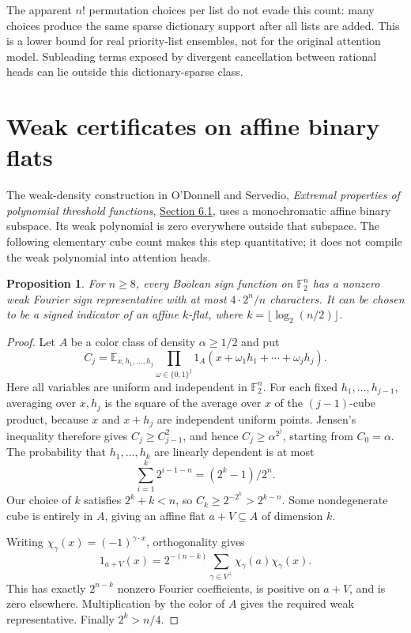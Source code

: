 \documentclass[11pt]{article}
\newtheorem{proposition}[theorem]{Proposition}
\begin{document}
The apparent $n!$ permutation choices per list do not evade this
count: many choices produce the same sparse dictionary support after
all lists are added. This is a lower bound for real priority-list
ensembles, not for the original attention model. Subleading terms
exposed by divergent cancellation between rational heads can lie
outside this dictionary-sparse class.

\section{Weak certificates on affine binary flats}

The weak-density construction in O'Donnell and Servedio,
\emph{Extremal properties of polynomial threshold functions},
\href{https://www.cs.columbia.edu/~rocco/Public/journal-revised2.pdf}{Section 6.1},
uses a monochromatic affine binary subspace. Its weak polynomial is
zero everywhere outside that subspace. The following elementary cube
count makes this step quantitative; it does not compile the weak
polynomial into attention heads.

\begin{proposition}\label{prop:weak-flat}
For $n\geq8$, every Boolean sign function on $\mathbb F_2^n$ has a
nonzero weak Fourier sign representative with at most $4\cdot2^n/n$
characters. It can be chosen to be a signed indicator of an affine
$k$-flat, where $k=\lfloor\log_2(n/2)\rfloor$.
\end{proposition}

\begin{proof}
Let $A$ be a color class of density $\alpha\geq1/2$ and put
\[
 C_j=\mathbb E_{x,h_1,\ldots,h_j}
       \prod_{\omega\in\{0,1\}^j}
       1_A(x+\omega_1h_1+\cdots+\omega_jh_j).
\]
Here all variables are uniform and independent in $\mathbb F_2^n$.
For each fixed $h_1,\ldots,h_{j-1}$, averaging over $x,h_j$ is the
square of the average over $x$ of the $(j-1)$-cube product, because
$x$ and $x+h_j$ are independent uniform points. Jensen's inequality
therefore gives $C_j\geq C_{j-1}^2$, and hence
$C_j\geq\alpha^{2^j}$, starting from $C_0=\alpha$.
The probability that $h_1,\ldots,h_k$ are linearly dependent is at
most
\[
 \sum_{i=1}^k2^{i-1-n}=(2^k-1)/2^n.
\]
Our choice of $k$ satisfies $2^k+k<n$, so
$C_k\geq2^{-2^k}>2^{k-n}$. Some nondegenerate cube is entirely in
$A$, giving an affine flat $a+V\subseteq A$ of dimension $k$.

Writing $\chi_\gamma(x)=(-1)^{\gamma\cdot x}$, orthogonality gives
\[
 1_{a+V}(x)=2^{-(n-k)}\sum_{\gamma\in V^\perp}
                 \chi_\gamma(a)\chi_\gamma(x).
\]
This has exactly $2^{n-k}$ nonzero Fourier coefficients, is positive
on $a+V$, and is zero elsewhere. Multiplication by the color of $A$
gives the required weak representative. Finally $2^k>n/4$.
\end{proof}
\end{document}
